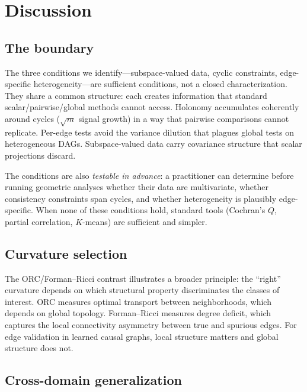 \documentclass[11pt]{article}
\begin{document}
\section{Discussion}
\label{sec:discussion}

\subsection{The boundary}

The three conditions we identify---subspace-valued data, cyclic constraints, edge-specific heterogeneity---are sufficient conditions, not a closed characterization.
They share a common structure: each creates information that standard scalar/pairwise/global methods cannot access.
Holonomy accumulates coherently around cycles ($\sqrt{m}$ signal growth) in a way that pairwise comparisons cannot replicate.
Per-edge tests avoid the variance dilution that plagues global tests on heterogeneous DAGs.
Subspace-valued data carry covariance structure that scalar projections discard.

The conditions are also \emph{testable in advance}: a practitioner can determine before running geometric analyses whether their data are multivariate, whether consistency constraints span cycles, and whether heterogeneity is plausibly edge-specific.
When none of these conditions hold, standard tools (Cochran's $Q$, partial correlation, $K$-means) are sufficient and simpler.

\subsection{Curvature selection}

The ORC/Forman--Ricci contrast illustrates a broader principle: the ``right'' curvature depends on which structural property discriminates the classes of interest.
ORC measures optimal transport between neighborhoods, which depends on global topology.
Forman--Ricci measures degree deficit, which captures the local connectivity asymmetry between true and spurious edges.
For edge validation in learned causal graphs, local structure matters and global structure does not.

\subsection{Cross-domain generalization}
\end{document}
